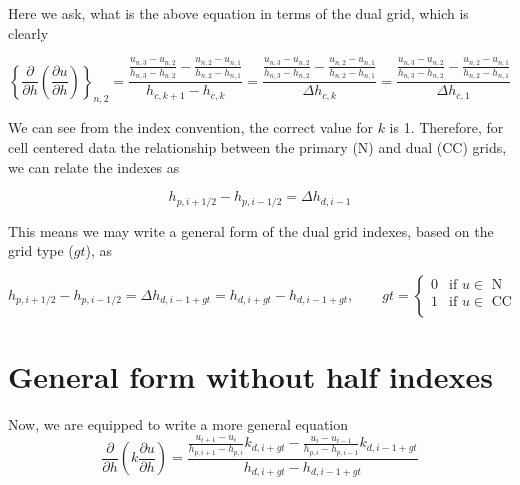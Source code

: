 \documentclass[11pt]{article}
\begin{document}
Here we ask, what is the above equation in terms of the dual grid, which is clearly

\begin{equation}
 \left\{\frac{\partial}{\partial h} \left( \frac{\partial u}{\partial h} \right) \right\}_{n,2}
 = \frac{ \frac{u_{n,3}-u_{n,2}}{h_{n,3}-h_{n,2}} -  \frac{u_{n,2}-u_{n,1}}{h_{n,2}-h_{n,1}} }{h_{c,k+1} - h_{c,k}}
 =
 \frac{ \frac{u_{n,3}-u_{n,2}}{h_{n,3}-h_{n,2}} -  \frac{u_{n,2}-u_{n,1}}{h_{n,2}-h_{n,1}} }{\Delta h_{c,k}}
 =
 \frac{ \frac{u_{n,3}-u_{n,2}}{h_{n,3}-h_{n,2}} -  \frac{u_{n,2}-u_{n,1}}{h_{n,2}-h_{n,1}} }{\Delta h_{c,1}}
\end{equation}

We can see from the index convention, the correct value for $k$ is 1. Therefore, for cell centered data the relationship between the primary (N) and dual (CC) grids, we can relate the indexes as

\begin{equation}
  h_{p,i+1/2} - h_{p,i-1/2} = \Delta h_{d,i-1}
\end{equation}


This means we may write a general form of the dual grid indexes, based on the grid type ($gt$), as

\begin{equation}
  h_{p,i+1/2} - h_{p,i-1/2} = \Delta h_{d,i-1+gt} = h_{d,i+gt} - h_{d,i-1+gt}
  , \qquad
 gt = 
\begin{cases} 
    0 & \text{if $u \in $ N} \\
    1 & \text{if $u \in $ CC} \\
 \end{cases}
\end{equation} 



\section{General form without half indexes}
Now, we are equipped to write a more general equation
\begin{equation}
\frac{\partial}{\partial h} \left( k \frac{\partial u}{\partial h} \right)
 = \frac{\frac{u_{i+1}-u_{i}}{h_{p,i+1}-h_{p,i}} k_{d,i+gt} - \frac{u_{i}-u_{i-1}}{h_{p,i}-h_{p,i-1}} k_{d,i-1+gt}}{h_{d,i+gt} - h_{d,i-1+gt}}
\end{equation}
\end{document}

